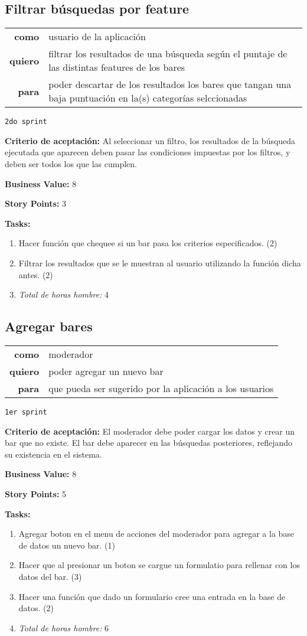 \documentclass[hidelinks,a4paper,11pt, nofootinbib]{article}
\newcommand{\userstory}[3]{
\begin{tabular}{|r p{10cm}|}
  \hline
  \textbf{como} & #1 \\
  \textbf{quiero} & #2 \\
  \textbf{para} & #3 \\
  \hline
\end{tabular}

}
\newcommand{\critdeacep}[1]{\textbf{Criterio de aceptación:} #1

}
\newcommand{\busvalue}[1]{\textbf{Business Value:} #1

}
\newcommand{\storypoints}[1]{\textbf{Story Points:} #1

}
\newcommand{\primersprint}{\texttt{1er sprint}

}
\newcommand{\segundosprint}{\texttt{2do sprint}

}
\newcommand{\tasks}[1]{\textbf{Tasks:} 

#1}
\begin{document}
\subsection*{Filtrar búsquedas por feature}
\userstory{usuario de la aplicación}{filtrar los resultados de una búsqueda según el puntaje de las distintas features de los bares}{poder descartar de los resultados los bares que tangan una baja puntuación en la(s) categorías selccionadas}
\segundosprint
\critdeacep{Al seleccionar un filtro, los resultados de la búsqueda ejecutada que aparecen deben pasar las condiciones impuestas por los filtros, y deben ser todos los que las cumplen.}
\busvalue{8}
\storypoints{3}
\tasks{
  \begin{enumerate}
    \item Hacer función que chequee si un bar pasa los criterios especificados. (2)
    \item Filtrar los resultados que se le muestran al usuario utilizando la función dicha antes. (2)
    \item[] \textit{Total de horas hombre:} 4
  \end{enumerate}
}

\subsection*{Agregar bares}
\userstory{moderador}{poder agregar un nuevo bar}{que pueda ser sugerido por la aplicación a los usuarios}
\primersprint
\critdeacep{El moderador debe poder cargar los datos y crear un bar que no existe. El bar debe aparecer en las búsquedas posteriores, reflejando su existencia en el sistema.}
\busvalue{8}
\storypoints{5}
\tasks{
  \begin{enumerate}
    \item Agregar boton en el menu de acciones del moderador para agregar a la base de datos un nuevo bar. (1)
    \item Hacer que al presionar un boton se cargue un formulatio para rellenar con los datos del bar. (3)
    \item Hacer una función que dado un formulario cree una entrada en la base de datos. (2)
    \item[] \textit{Total de horas hombre:} 6
  \end{enumerate}
}
\end{document}

